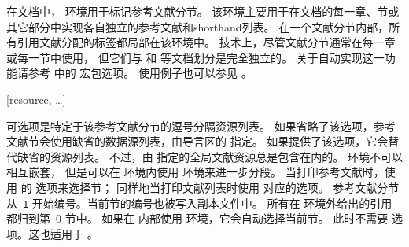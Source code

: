 在文档中， 环境用于标记参考文献分节。
该环境主要用于在文档的每一章、节或其它部分中实现各自独立的参考文献和shorthand列表。
在一个文献分节内部，所有引用文献分配的标签都局部在该环境中。
技术上，尽管文献分节通常在每一章或每一节中使用，
但它们与  和  等文档划分是完全独立的。
关于自动实现这一功能请参考  中的  宏包选项。
使用例子也可以参见 。

\begin{ltxsyntax}

[resource, \dots]


可选项是特定于该参考文献分节的逗号分隔资源列表。
如果省略了该选项，参考文献节会使用缺省的数据源列表，由导言区的  指定。
如果提供了该选项，它会替代缺省的资源列表。
不过，由  指定的全局文献资源总是包含在内的。
 环境不可以相互嵌套，
但是可以在  环境内使用  环境来进一步分段。
当打印参考文献时，使用  的  选项来选择节；
同样地当打印文献列表时使用  对应的选项。
参考文献分节从~\texttt{1} 开始编号。当前节的编号也被写入副本文件中。
所有在  环境外给出的引用都归到第~0 节中。
如果在  内部使用  环境，它会自动选择当前节。
此时不需要  选项。这也适用于 。


\end{ltxsyntax}
